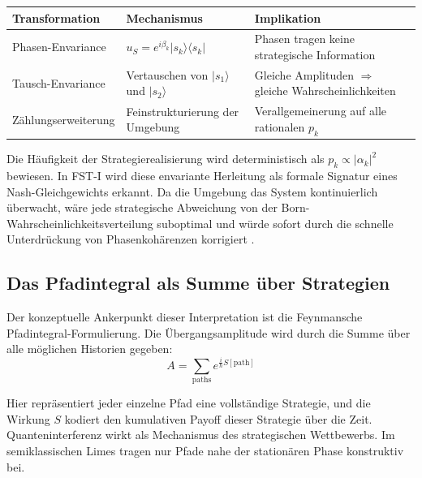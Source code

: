 \documentclass[12pt,a4paper]{article}
\theoremstyle{remark}
\begin{document}
\begin{center}
\begin{tabular}{lll}
\toprule
\textbf{Transformation} & \textbf{Mechanismus} & \textbf{Implikation} \\
\midrule
Phasen-Envariance & $u_S = e^{i\beta_k}|s_k\rangle\langle s_k|$ & Phasen tragen keine strategische Information \\
Tausch-Envariance & Vertauschen von $|s_1\rangle$ und $|s_2\rangle$ & Gleiche Amplituden $\Rightarrow$ gleiche Wahrscheinlichkeiten \\
Z\"ahlungserweiterung & Feinstrukturierung der Umgebung & Verallgemeinerung auf alle rationalen $p_k$ \\
\bottomrule
\end{tabular}
\end{center}

Die H\"aufigkeit der Strategierealisierung wird deterministisch als $p_k \propto |\alpha_k|^2$ bewiesen. In FST-I wird diese envariante Herleitung als formale Signatur eines Nash-Gleichgewichts erkannt. Da die Umgebung das System kontinuierlich \"uberwacht, w\"are jede strategische Abweichung von der Born-Wahrscheinlichkeitsverteilung suboptimal und w\"urde sofort durch die schnelle Unterdr\"uckung von Phasenkoh\"arenzen korrigiert \citep{DynamicalOrigin2005}.

\subsection{Das Pfadintegral als Summe \"uber Strategien}

Der konzeptuelle Ankerpunkt dieser Interpretation ist die Feynmansche Pfadintegral-Formulierung. Die \"Ubergangsamplitude wird durch die Summe \"uber alle m\"oglichen Historien gegeben:
\begin{equation}
A = \sum_{\text{paths}} e^{\frac{i}{\hbar} S[\text{path}]}
\end{equation}

Hier repr\"asentiert jeder einzelne Pfad eine vollst\"andige Strategie, und die Wirkung $S$ kodiert den kumulativen Payoff dieser Strategie \"uber die Zeit. Quanteninterferenz wirkt als Mechanismus des strategischen Wettbewerbs. Im semiklassischen Limes tragen nur Pfade nahe der station\"aren Phase konstruktiv bei.
\end{document}
